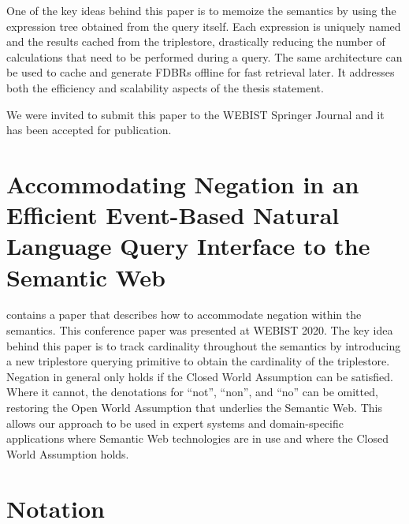 \documentclass[../main.tex]{subfiles}
\begin{document}
\begin{refsection}
One of the key ideas behind this paper is to memoize the semantics by using the expression tree obtained from the query itself.  Each expression is uniquely named and the results cached from the triplestore, drastically reducing the number of calculations that need to be performed during a query.  The same architecture can be used to cache and generate FDBRs offline for fast retrieval later.  It addresses both the efficiency and scalability aspects of the thesis statement.


We were invited to submit this paper to the WEBIST Springer Journal and it has been accepted for publication.

\section{Accommodating Negation in an Efficient Event-Based Natural Language Query Interface to the Semantic Web}

\textbf{} contains a paper that describes how to accommodate negation
within the semantics.  This conference paper was presented at WEBIST 2020.
The key idea behind this paper is to track cardinality throughout the semantics by introducing
a new triplestore querying primitive to obtain the cardinality of the triplestore.  Negation
in general only holds if the Closed World Assumption can be satisfied.  Where it cannot, the
denotations for ``not'', ``non'', and ``no'' can be omitted, restoring the Open World Assumption
that underlies the Semantic Web.  This allows our approach to be used in expert systems and domain-specific applications where Semantic Web technologies are in use and where the Closed World Assumption holds.

\section{Notation}


\end{refsection}
\end{document}
